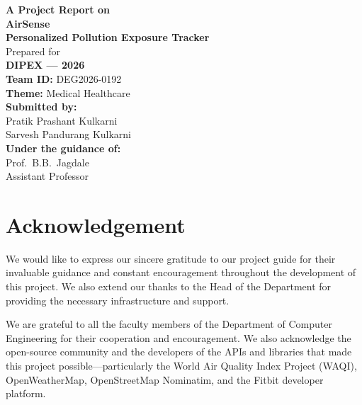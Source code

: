 \documentclass[12pt,a4paper]{report}
\begin{document}
\begin{titlepage}
\centering
\vspace*{0.5cm}

{\Large\textbf{A Project Report on}}\\[0.8cm]
{\Huge\textbf{AirSense}}\\[0.4cm]
{\Large\textbf{Personalized Pollution Exposure Tracker}}\\[1.5cm]

{\large Prepared for}\\[0.4cm]
{\Large\textbf{DIPEX --- 2026}}\\[0.8cm]

{\large\textbf{Team ID:} DEG2026-0192}\\[0.3cm]
{\large\textbf{Theme:} Medical Healthcare}\\[1.2cm]

{\large\textbf{Submitted by:}}\\[0.4cm]
{Pratik Prashant Kulkarni}\\[0.15cm]
{Sarvesh Pandurang Kulkarni}\\[1.5cm]

{\large\textbf{Under the guidance of:}}\\[0.3cm]
{\large Prof.\ B.B.\ Jagdale}\\[0.2cm]
{\large Assistant Professor}

\vfill
\end{titlepage}


\chapter*{Acknowledgement}
We would like to express our sincere gratitude to our project guide for their invaluable guidance and constant encouragement throughout the development of this project. We also extend our thanks to the Head of the Department for providing the necessary infrastructure and support.

We are grateful to all the faculty members of the Department of Computer Engineering for their cooperation and encouragement. We also acknowledge the open-source community and the developers of the APIs and libraries that made this project possible---particularly the World Air Quality Index Project (WAQI), OpenWeatherMap, OpenStreetMap Nominatim, and the Fitbit developer platform.
\end{document}

